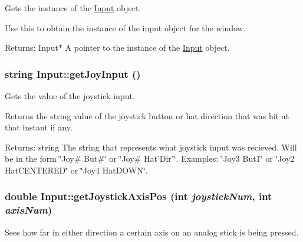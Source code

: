 Gets the instance of the \hyperlink{class_input}{Input} object. 

Use this to obtain the instance of the input object for the window. \begin{Desc}
\item[Returns:]Input$\ast$ A pointer to the instance of the \hyperlink{class_input}{Input} object. \end{Desc}
\hypertarget{class_input_1ba9317efac42d8f0ff0d81d22585e77}{
\subsubsection[{getJoyInput}]{\setlength{\rightskip}{0pt plus 5cm}string Input::getJoyInput ()}}
\label{class_input_1ba9317efac42d8f0ff0d81d22585e77}


Gets the value of the joystick input. 

Returns the string value of the joystick button or hat direction that was hit at that instant if any. \begin{Desc}
\item[Returns:]string The string that represents what joystick input was recieved. Will be in the form \char`\"{}Joy\# But\#\char`\"{} or \char`\"{}Joy\# Hat'Dir'\char`\"{}. Examples: \char`\"{}Joy3 But1\char`\"{} or \char`\"{}Joy2 HatCENTERED\char`\"{} or \char`\"{}Joy4 HatDOWN\char`\"{}. \end{Desc}
\hypertarget{class_input_265e726a4efb833935ccc9ce82af34dc}{
\subsubsection[{getJoystickAxisPos}]{\setlength{\rightskip}{0pt plus 5cm}double Input::getJoystickAxisPos (int {\em joystickNum}, \/  int {\em axisNum})}}
\label{class_input_265e726a4efb833935ccc9ce82af34dc}


Sees how far in either direction a certain axis on an analog stick is being pressed. 

